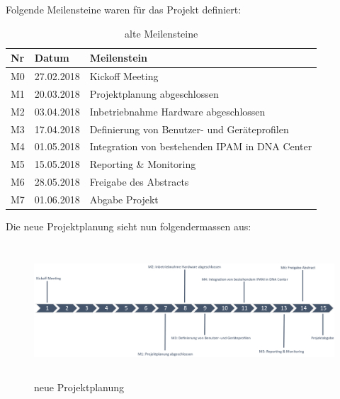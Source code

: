 Folgende Meilensteine waren für das Projekt definiert:
\begin{table}[H]
	\centering
	\begin{tabularx}{\textwidth}{p{1cm}| p{2.5cm}| X}
		\rowcolor{gray!50}
		\textbf{Nr} & \textbf{Datum} & \textbf{Meilenstein} \\
		\hline	
		M0 & 27.02.2018 & Kickoff Meeting \\
		M1 & 20.03.2018 & Projektplanung abgeschlossen \\
		M2 & 03.04.2018 & Inbetriebnahme Hardware abgeschlossen \\
		M3 & 17.04.2018 & Definierung von Benutzer- und Geräteprofilen \\
		M4 & 01.05.2018 & Integration von bestehenden IPAM in DNA Center \\
		M5 & 15.05.2018 & Reporting \& Monitoring \\
		M6 & 28.05.2018 & Freigabe des Abstracts \\
		M7 & 01.06.2018 & Abgabe Projekt \\
	\end{tabularx}
	\caption{alte Meilensteine}
	\label{tab:alte Meilensteine}
\end{table}

Die neue Projektplanung sieht nun folgendermassen aus:
\begin{figure}[H]
	\centering
	\includegraphics[height=5cm]{img/ZeitlichePlanung_v3.png}
	\caption{neue Projektplanung}
	\label{fig:neue Projektplanung}
\end{figure} 



